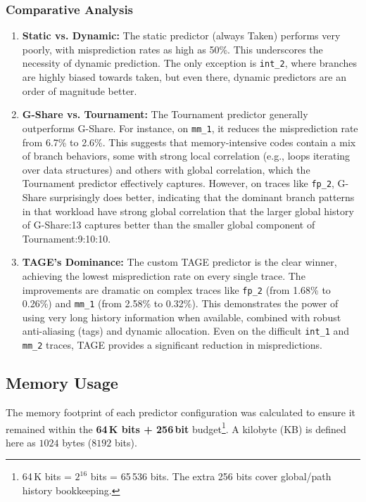 \documentclass[sigconf, screen]{acmart}
\begin{document}
\subsubsection{Comparative Analysis}
\begin{enumerate}
    \item \textbf{Static vs. Dynamic:} The static predictor (always Taken) performs very poorly, with misprediction rates as high as 50\%. This underscores the necessity of dynamic prediction. The only exception is \texttt{int\_2}, where branches are highly biased towards taken, but even there, dynamic predictors are an order of magnitude better.
    \item \textbf{G-Share vs. Tournament:} The Tournament predictor generally outperforms G-Share. For instance, on \texttt{mm\_1}, it reduces the misprediction rate from 6.7\% to 2.6\%. This suggests that memory-intensive codes contain a mix of branch behaviors, some with strong local correlation (e.g., loops iterating over data structures) and others with global correlation, which the Tournament predictor effectively captures. However, on traces like \texttt{fp\_2}, G-Share surprisingly does better, indicating that the dominant branch patterns in that workload have strong global correlation that the larger global history of G-Share:13 captures better than the smaller global component of Tournament:9:10:10.
    \item \textbf{TAGE's Dominance:} The custom TAGE predictor is the clear winner, achieving the lowest misprediction rate on every single trace. The improvements are dramatic on complex traces like \texttt{fp\_2} (from 1.68\% to 0.26\%) and \texttt{mm\_1} (from 2.58\% to 0.32\%). This demonstrates the power of using very long history information when available, combined with robust anti-aliasing (tags) and dynamic allocation. Even on the difficult \texttt{int\_1} and \texttt{mm\_2} traces, TAGE provides a significant reduction in mispredictions.
\end{enumerate}

\subsection{Memory Usage}
The memory footprint of each predictor configuration was calculated to ensure it remained within the \textbf{64\,K bits + 256\,bit} budget\footnote{%
64\,K bits = $2^{16}$ bits = 65\,536 bits. The extra 256 bits cover global/path history bookkeeping.}.
A kilobyte (KB) is defined here as $1024$ bytes ($8192$ bits).
\end{document}
